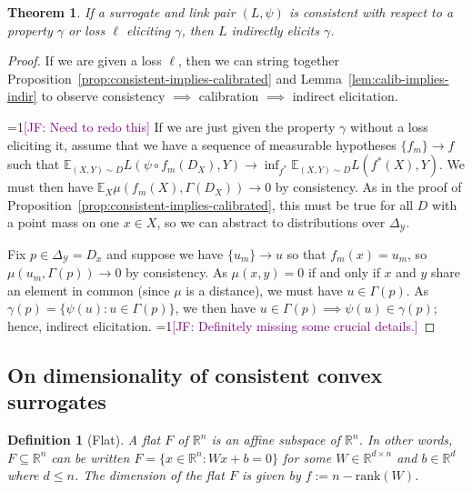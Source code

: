 \documentclass{article}
\newcommand{\Comments}{1}
\newcommand{\mynote}[2]{\ifnum\Comments=1\textcolor{#1}{#2}\fi}
\newcommand{\jessie}[1]{\mynote{purple}{[JF: #1]}}
\newcommand{\reals}{\mathbb{R}}
\newcommand{\simplex}{\Delta_\Y}
\newcommand{\E}{\mathbb{E}}
\newcommand{\X}{\mathcal{X}}
\newcommand{\Y}{\mathcal{Y}}
\newtheorem{theorem}{Theorem}
\newtheorem{definition}{Definition}
\begin{document}
\begin{theorem}\label{thm:consistent-implies-indir-elic}
	If a surrogate and link pair $(L, \psi)$ is consistent with respect to a property $\gamma$ or loss $\ell$ eliciting $\gamma$, then $L$ indirectly elicits $\gamma$.
\end{theorem}
\begin{proof}
If we are given a loss $\ell$, then we can string together Proposition~\ref{prop:consistent-implies-calibrated} and Lemma~\ref{lem:calib-implies-indir} to observe consistency $\implies$ calibration $\implies$ indirect elicitation.

\jessie{Need to redo this}
If we are just given the property $\gamma$ without a loss eliciting it, assume that we have a sequence of measurable hypotheses $\{f_m\} \to f$ such that $\E_{(X,Y) \sim D} L(\psi \circ f_m(D_X), Y) \to \inf_{f^*}\E_{(X,Y) \sim D} L(f^*(X), Y)$.
We must then have $\E_X \mu(f_m(X), \Gamma(D_X)) \to 0$ by consistency.
As in the proof of Proposition~\ref{prop:consistent-implies-calibrated}, this must be true for all $D$ with a point mass on one $x \in X$, so we can abstract to distributions over $\simplex$.

Fix $p \in \simplex = D_x$ and suppose we have $\{u_m\} \to u$ so that $f_m(x) = u_m$, so $\mu(u_m, \Gamma(p)) \to 0$ by consistency.
As $\mu(x,y) = 0$ if and only if $x$ and $y$ share an element in common (since $\mu$ is a distance), we must have $u \in \Gamma(p)$.
As $\gamma(p) = \{\psi(u) : u \in \Gamma(p)\}$, we then have $u \in \Gamma(p) \implies \psi(u) \in \gamma(p)$; hence, indirect elicitation.
\jessie{Definitely missing some crucial details.}
%
\end{proof}


\subsection{On dimensionality of consistent convex surrogates}
\begin{definition}[Flat]
	A \emph{flat} $F$ of $\reals^n$ is an affine subspace of $\reals^n$.
	In other words, $F\subseteq \reals^n$ can be written $F=\{x\in\reals^n : Wx + b = 0\}$ for some $W\in\reals^{d\times n}$ and $b\in\reals^d$ where $d\leq n$.
	The dimension of the flat $F$ is given by $f := n - \mathrm{rank}(W)$.
\end{definition}
\end{document}
